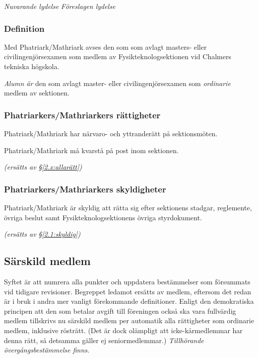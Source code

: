 \documentclass{article}
\newenvironment{lydelse}
    {\begin{paracol}{2}%
        \emph{Nuvarande lydelse}%
        \switchcolumn%
        \emph{Föreslagen lydelse}%
    \end{paracol}%
    \begin{enumerate}[label=\thesubsection.\arabic*]%
    \begin{paracol}{2}%
    }{\end{paracol}\end{enumerate}}
\newcommand{\itemb}{\item[\textbullet]}
\begin{document}
\begin{lydelse}%
  \subsubsection*{Definition}
    \itemb Med Phatriark/Mathriark avses den som som avlagt masters- eller civil\-ingenjörs\-examen som medlem av Fysik\-teknolog\-sektionen vid Ch\-al\-mers tekniska högskola.

  \switchcolumn
  \setcounter{enumi}{0}
    \item \emph{Alumn är} den som avlagt master- eller civilingenjörsexamen som \emph{ordinarie} medlem av sektionen.
    
  \switchcolumn*
    \subsubsection*{Phatriarkers/Mathriarkers rättigheter}%
    \itemb Phatriark/Mathriark har närvaro- och yttranderätt på sektionsmöten.

    \itemb Phatriark/Mathriark må kvarstå på post inom sektionen.
    
  \switchcolumn
    \emph{(ersätts av \S \ref{2.x:allarätt})}

  \switchcolumn*
    \subsubsection*{Phatriarkers/Mathriarkers skyldigheter}%
    \itemb Phatriark/Mathriark är skyldig att rätta sig efter sektionens stadgar, reglemente, övriga beslut samt Fysikteknologsektionens övriga styrdokument.
    
  \switchcolumn
    \emph{(ersätts av \S \ref{2.1:skyldig})}
\end{lydelse}

\subsection{Särskild medlem}
Syftet är att numrera alla punkter och uppdatera bestämmelser som försummats vid tidigare revisioner.
Begreppet ledamot ersätts av medlem, eftersom det redan är i bruk i andra mer vanligt förekommande definitioner.
Enligt den demokratiska principen att den som betalar avgift till föreningen också ska vara fullvärdig medlem tillskrivs nu särskild medlem per automatik alla rättigheter som ordinarie medlem, inklusive rösträtt.
(Det är dock olämpligt att icke-kårmedlemmar har denna rätt, så detsamma gäller ej seniormedlemmar.)
\emph{Tillhörande övergångsbestämmelse finns.}
\end{document}

